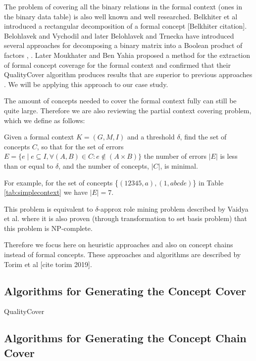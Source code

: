 \documentclass[acmconf,authordraft]{acmart}
\begin{document}
The problem of covering all the binary relations in the formal context (ones in the binary data table) is also well known and well researched.  Belkhiter et al introduced a rectangular decomposition of a formal concept [Belkhiter citation]. Belohlavek and Vychodil and later Belohlavek and Trnecka have introduced several approaches for decomposing a binary matrix into a Boolean product of factors \cite{belohlavek_discovery_2010}, \cite{belohlavek_-below_2015}. Later Moukhater and Ben Yahia proposed a method for the extraction of formal concept coverage for the formal context and confirmed that their QualityCover algorithm produces results that are superior to previous approaches \cite{mouakher_qualitycover:_2016}. We will be applying this approach to our case study.

The amount of concepts needed to cover the formal context fully can still be quite large. Therefore we are also reviewing the partial context covering problem, which we define as follows:

\begin{definition}
\label{def_errors}

Given a formal context $ K = (G, M, I)$ and a threshold $\delta$, find the set of concepts $C$, so that for the set of errors $E = \{e \mid e \subseteq I, \forall (A, B) \in C: e \notin (A \times B)  \}$ the number of errors $|E|$ is less than or equal to $\delta$, and the number of concepts, $|C|$, is minimal.

\end{definition}

For example, for the set of concepts \{${(12345, a), (1, abcde)}$\} in Table \ref{tab:simplecontext}  we have $|E|=7$.

This problem is equivalent to $\delta$-approx role mining problem described by Vaidya et al. \cite{vaidya_role_2007} where it is also proven (through transformation to set basis problem) that this problem is NP-complete. 

Therefore we focus here on heuristic approaches and also on concept chains instead of formal concepts. These approaches and algorithms are described by Torim et al [cite torim 2019].

\subsection{Algorithms for Generating the Concept Cover}
QualityCover

\subsection{Algorithms for Generating the Concept Chain Cover}
\end{document}
